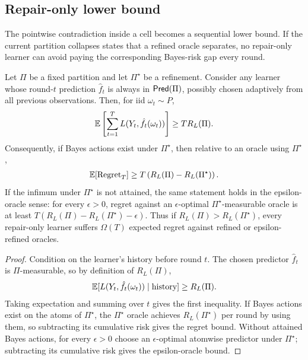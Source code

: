 \subsection{Repair-only lower bound}

The pointwise contradiction inside a cell becomes a sequential lower bound. If the current partition collapses states that a refined oracle separates, no repair-only learner can avoid paying the corresponding Bayes-risk gap every round.

\begin{theorem}
\label{thm:repair-only-regret}
Let $\Pi$ be a fixed partition and let $\Pi^\star$ be a refinement. Consider any learner whose round-$t$ prediction $\hat f_t$ is always in $\mathsf{Pred}(\Pi)$, possibly chosen adaptively from all previous observations. Then, for iid $\omega_t\sim P$,
\begin{align*}
\operatorname*{\mathbb{E}}\left[\sum_{t=1}^T L(Y_t,\hat f_t(\omega_t))\right]
\ge
T R_L(\Pi).
\end{align*}
Consequently, if Bayes actions exist under $\Pi^\star$, then relative to an oracle using $\Pi^\star$,
\begin{align*}
\operatorname*{\mathbb{E}}[\mathrm{Regret}_T]
\ge
T\left(R_L(\Pi)-R_L(\Pi^\star)\right).
\end{align*}
If the infimum under $\Pi^\star$ is not attained, the same statement holds in the epsilon-oracle sense: for every $\epsilon>0$, regret against an $\epsilon$-optimal $\Pi^\star$-measurable oracle is at least $T(R_L(\Pi)-R_L(\Pi^\star)-\epsilon)$. Thus if $R_L(\Pi)>R_L(\Pi^\star)$, every repair-only learner suffers $\Omega(T)$ expected regret against refined or epsilon-refined oracles.
\end{theorem}

\begin{proof}
Condition on the learner's history before round $t$. The chosen predictor $\hat f_t$ is $\Pi$-measurable, so by definition of $R_L(\Pi)$,
\begin{align*}
\operatorname*{\mathbb{E}}[L(Y_t,\hat f_t(\omega_t))\mid \text{history}]
\ge
R_L(\Pi).
\end{align*}
Taking expectation and summing over $t$ gives the first inequality. If Bayes actions exist on the atoms of $\Pi^\star$, the $\Pi^\star$ oracle achieves $R_L(\Pi^\star)$ per round by using them, so subtracting its cumulative risk gives the regret bound. Without attained Bayes actions, for every $\epsilon>0$ choose an $\epsilon$-optimal atomwise predictor under $\Pi^\star$; subtracting its cumulative risk gives the epsilon-oracle bound.
\end{proof}

